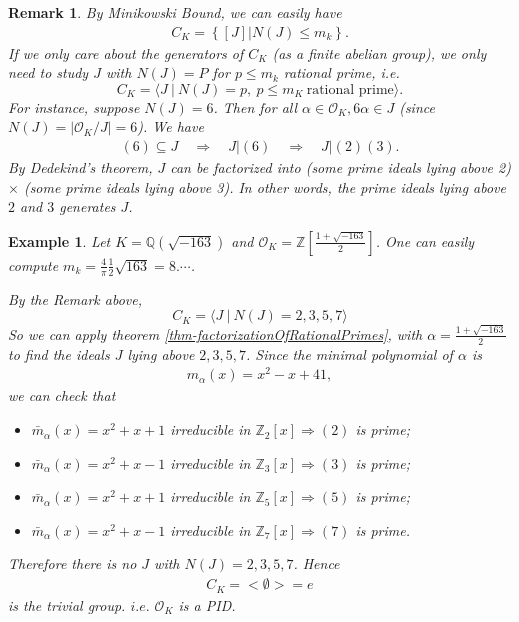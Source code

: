 \documentclass[11pt]{book}
\newtheorem{example}[theorem]{Example}
\newtheorem{remark}[theorem]{Remark}
\begin{document}
\begin{remark} \label{rmk-ckgenerator}
    By Minikowski Bound, we can easily have \begin{align*}
        C_K = \left\{[J]| N(J) \leq m_k\right\}.
    \end{align*}
    If we only care about the generators of \(C_K\) (as a finite abelian group), we only need to study \(J\) with \(N(J) = P\) for \(p \leq m_k\) rational prime, i.e.
    $$C_K = \langle J\ |\ N(J) = p,\ p \leq m_K\ \text{rational prime}\rangle.$$
    For instance, suppose \(N(J) = 6\). Then for all \(\alpha \in \mathcal{O}_K, 6\alpha \in J\) (since \(N(J) = |\mathcal{O}_K/J|=6\)). We have
    \begin{align*}
        (6) \subseteq J \quad \Rightarrow \quad J|(6)\quad \Rightarrow \quad J|(2)(3).
    \end{align*}
    By Dedekind's theorem, \(J\) can be factorized into (some prime ideals lying above 2) \(\times\) (some prime ideals lying above 3). In other words, the prime ideals lying above $2$ and $3$ generates \(J\).
\end{remark}

\begin{example}
    Let \(K = \mathbb{Q}(\sqrt{-163})\) and \(\mathcal{O}_K = \displaystyle \mathbb{Z}[\frac{1+\sqrt{-163}}{2}]\). One can easily compute \(m_k = \frac{4}{\pi} \frac{1}{2} \sqrt{163} = 8. \cdots\).

    By the Remark above, 
    \[C_K = \langle J\ |\ N(J) = 2,3,5,7 \rangle\] 
    So we can apply theorem \ref{thm-factorizationOfRationalPrimes}, with \(\alpha = \frac{1+\sqrt{-163}}{2}\) to find the ideals $J$ lying above $2,3,5,7$. Since the minimal polynomial of $\alpha$ is
    \begin{align*}
        m_\alpha(x) = x^2 - x + 41,
    \end{align*}
    we can check that 
    \begin{itemize}
        \item[\((2)\):] \(\bar m_\alpha(x) = x^2 + x + 1\) irreducible in \(\mathbb{Z}_2[x] \Rightarrow (2)\) is prime;
        \item[\((3)\):] \(\bar m_\alpha(x) = x^2 + x - 1\) irreducible in \(\mathbb{Z}_3[x] \Rightarrow (3)\) is prime;
        \item[\((5)\):] \(\bar m_\alpha(x) = x^2 + x + 1\) irreducible in \(\mathbb{Z}_5[x] \Rightarrow (5)\) is prime;
        \item[\((7)\):] \(\bar m_\alpha(x) = x^2 + x - 1\) irreducible in \(\mathbb{Z}_7[x] \Rightarrow (7)\) is prime.
    \end{itemize}
    Therefore there is no \(J\) with \(N(J) =2,3,5,7\). Hence 
    \begin{align*}
        C_K = <\emptyset> = {e}
    \end{align*}
    is the trivial group. \(i.e.\) \(\mathcal{O}_K\) is a PID.
\end{example}
\end{document}

